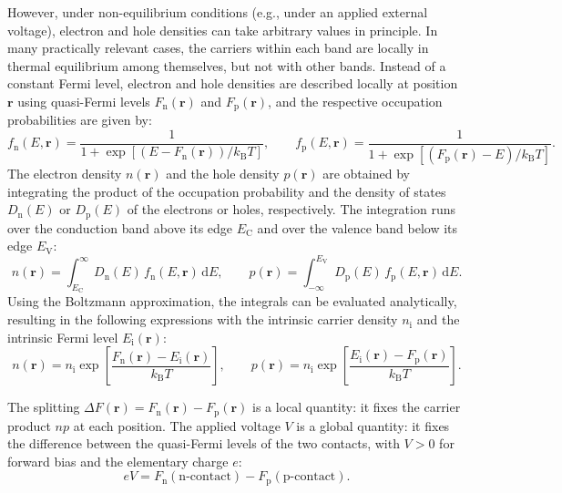 However, under non-equilibrium conditions (e.g., under an applied external voltage),
electron and hole densities can take arbitrary values in principle. In many
practically relevant cases, the carriers within each band are locally in thermal equilibrium
among themselves, but not with other bands. Instead of a constant Fermi level,
electron and hole densities are described locally at position $\mathbf{r}$ using quasi-Fermi levels
$F_{\mathrm{n}}(\mathbf{r})$ and $F_{\mathrm{p}}(\mathbf{r})$, and the respective
occupation probabilities are given by:
\begin{equation}
	f_{\mathrm{n}}(E, \mathbf{r}) = \frac{1}{1+\exp\left[(E-F_{\mathrm{n}}(\mathbf{r}))/k_{\mathrm{B}}T\right]}, \qquad
	f_{\mathrm{p}}(E, \mathbf{r}) = \frac{1}{1+\exp\left[(F_{\mathrm{p}}(\mathbf{r})-E)/k_{\mathrm{B}}T\right]}.
	\label{eq:occupation_probabilities}
\end{equation}
The electron density $n(\mathbf{r})$ and the hole density $p(\mathbf{r})$ are obtained
by integrating the product of the occupation probability and the density of states
$D_{\mathrm{n}}(E)$ or $D_{\mathrm{p}}(E)$ of the electrons or holes, respectively.
The integration runs over the conduction band above its edge $E_{\mathrm{C}}$ and
over the valence band below its edge $E_{\mathrm{V}}$:
\begin{equation}
	n(\mathbf{r}) = \int_{E_{\mathrm{C}}}^{\infty}D_{\mathrm{n}}(E)\, f_{\mathrm{n}}
	(E,\mathbf{r}) \,\mathrm{d}E, \qquad p(\mathbf{r}) = \int_{-\infty}^{E_{\mathrm{V}}}
	D_{\mathrm{p}}(E)\, f_{\mathrm{p}}(E,\mathbf{r}) \,\mathrm{d}E.
\end{equation}
Using the Boltzmann approximation, the integrals can be evaluated analytically, resulting
in the following expressions with the intrinsic carrier density $n_{\mathrm{i}}$ and the
intrinsic Fermi level $E_{\mathrm{i}}(\mathbf{r})$:
\begin{equation}
	n(\mathbf{r}) = n_{\mathrm{i}}\exp\left[\frac{F_{\mathrm{n}}(\mathbf{r}) - E_{\mathrm{i}}(\mathbf{r})}{k_{\mathrm{B}}T}\right], \qquad
	p(\mathbf{r}) = n_{\mathrm{i}}\exp\left[\frac{E_{\mathrm{i}}(\mathbf{r}) - F_{\mathrm{p}}(\mathbf{r})}{k_{\mathrm{B}}T}\right].
\end{equation}

The splitting $\Delta F(\mathbf{r})=F_{\mathrm{n}}(\mathbf{r})-F_{\mathrm{p}}(\mathbf{r}
)$ is a local quantity: it fixes the carrier product $np$ at each position. The applied
voltage $V$ is a global quantity: it fixes the difference between the quasi-Fermi
levels of the two contacts, with $V>0$ for forward bias and the elementary charge $e$:
\begin{equation}
	eV=F_{\mathrm{n}}(\text{n-contact})-F_{\mathrm{p}}(\text{p-contact}).
\end{equation}

